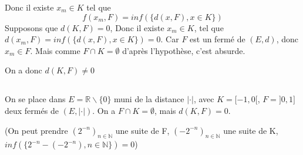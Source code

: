 \documentclass[a4paper,12pt]{book}
\begin{document}
Donc il existe $x_m \in K$ tel que 
$$
f(x_m,F)=inf(\{d(x,F),x \in K\})
$$ 
Supposons que $d(K,F)=0$, Donc il existe $x_m \in K$, tel que 
$d(x_m,F)=inf(\{d(x,F),x \in K\})=0$. Car $F$ est un fermé de $(E,d)$, donc $x_m \in F$. Mais comme $F \cap K=\emptyset$ d'après l'hypothèse, c'est absurde. 

On a donc $\boxed{d(K,F) \neq 0}$

\subsection{}
On se place dans $E=\mathbb{R} \backslash \{0\}$ muni de la distance $\vert\cdot\vert$, 
avec $K=[-1,0[$, $F=]0,1]$ deux fermés de $(E,\vert\cdot\vert)$. On a $F \cap K=\emptyset$, mais $d(K,F)=0$. 

(On peut prendre $(2^{-n})_{n \in \mathbb{N}}$ une suite de F, $(-2^{-n})_{n \in \mathbb{N}}$ une suite de K, $inf(\{2^{-n}-(-2^{-n}),n \in \mathbb{N}\})=0$)


 
\end{document}
